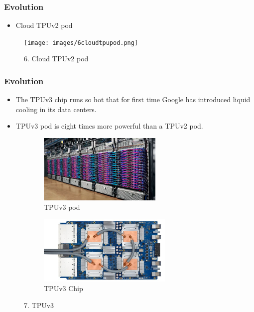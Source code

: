 \documentclass[c]{beamer}
\begin{document}
	\begin{frame} [c]
		\frametitle{Evolution}
        \begin{itemize}
        \justifying
              \item \large Cloud TPUv2 pod
           \end{itemize} 
           \begin{figure}
            \centering
            \texttt{[image: images/6cloudtpupod.png]}
            \caption{6. Cloud TPUv2 pod}
            \label{fig:Cloud TPUv2 pod}
           \end{figure}
	\end{frame}
	\begin{frame}[h]
	\frametitle{Evolution}
	\begin{itemize}
	    	\justifying
			\item {\footnotesize The TPUv3 chip runs so hot that for first time Google has introduced liquid cooling in its data centers.}
\item{\footnotesize TPUv3 pod is eight times more powerful than a TPUv2 pod.}
\newline
	\end{itemize}
	\begin{figure}[h]
 \hfill
\begin{subfigure}{0.40\textwidth}
\includegraphics[width=1.05\linewidth,height=3.3cm]{images/7atpuv3pod.png} 
\caption{ TPUv3 pod}
\label{fig:TPUv3 pod}
\end{subfigure}
\space
\space
\space
\begin{subfigure}{0.5\textwidth}
\includegraphics[width=.95\linewidth,height=3.3cm]{images/7btpuv3.png}
\caption{TPUv3 Chip}
\label{fig:TPUv3 Chip}
\end{subfigure}
 
\caption{7. TPUv3}
\label{fig:TPUv3}
\end{figure}
	\end{frame}
\end{document}
